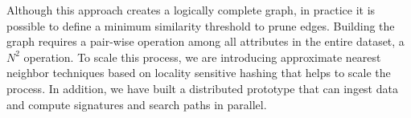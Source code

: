 Although this approach creates a logically complete graph, in practice it is
possible to define a minimum similarity threshold to prune edges. Building the
graph requires a pair-wise operation among all attributes in the
entire dataset, a $N^2$ operation. To scale this process, we are introducing
approximate nearest neighbor techniques based on locality sensitive hashing \cite{DBLP:conf/compgeom/DatarIIM04}
that helps to scale the process. In addition, we have built a distributed
prototype that can ingest data and compute signatures and search paths in
parallel.


